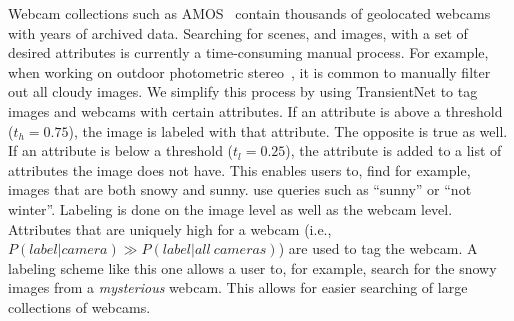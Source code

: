 \documentclass[10pt,twocolumn,letterpaper]{article}
\begin{document}
Webcam collections such as AMOS~\cite{jacobs07amos} contain thousands of
geolocated webcams with years of archived data.  Searching for scenes, and
images, with a set of desired attributes is currently a time-consuming manual
process. For example, when working on outdoor photometric
stereo~\cite{abramsheliometric}, it is common to manually filter out all cloudy
images. We simplify this process by using TransientNet to tag images and
webcams with certain attributes.  If an attribute is above a threshold ($t_h =
0.75$), the image is labeled with that attribute.  The opposite is true as
well. If an attribute is below a threshold ($t_l = 0.25$), the attribute is
added to a list of attributes the image does not have. This enables users to,
find for example, images that are both snowy and sunny.  use queries such as
``sunny'' or ``not winter''. Labeling is done on the image level as well as the
webcam level. Attributes that are uniquely high for a webcam (i.e.,
$P(label|camera)\gg P(label|all\ cameras)$) are used to tag the webcam. A
labeling scheme like this one allows a user to, for example, search for the
snowy images from a \textit{mysterious} webcam. This allows for easier
searching of large collections of webcams.
\end{document}
